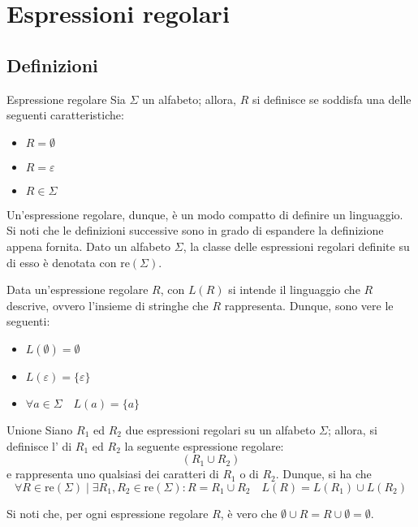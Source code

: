 \documentclass[a4paper, 12pt]{report}
\begin{document}
    \section{Espressioni regolari}

    \subsection{Definizioni}

    \begin{frameddefn}{Espressione regolare}
        Sia $\Sigma$ un alfabeto; allora, $R$ si definisce  se soddisfa una delle seguenti caratteristiche:

        \begin{itemize}
            \item $R = \emptyset$
            \item $R = \varepsilon$
            \item $R \in \Sigma$
        \end{itemize}

        Un'espressione regolare, dunque, è un modo compatto di definire un linguaggio. Si noti che le definizioni successive sono in grado di espandere la definizione appena fornita. Dato un alfabeto $\Sigma$, la classe delle espressioni regolari definite su di esso è denotata con $\mathrm{re}(\Sigma)$.

        Data un'espressione regolare $R$, con $L(R)$ si intende il linguaggio che $R$ descrive, ovvero l'insieme di stringhe che $R$ rappresenta. Dunque, sono vere le seguenti:

        \begin{itemize}
            \item $L(\emptyset) = \emptyset$
            \item $L(\varepsilon) = \{ \varepsilon \}$
            \item $\forall a \in \Sigma \quad L(a) = \{ a\}$
        \end{itemize}
    \end{frameddefn}

    \begin{frameddefn}{Unione}
        Siano $R_1$ ed $R_2$ due espressioni regolari su un alfabeto $\Sigma$; allora, si definisce l' di $R_1$ ed $R_2$ la seguente espressione regolare: $$(R_1 \cup R_2)$$ e rappresenta uno qualsiasi dei caratteri di $R_1$ o di $R_2$. Dunque, si ha che $$\forall R \in \mathrm{re}(\Sigma) \mid \exists R_1, R_2 \in \mathrm{re}(\Sigma) : R = R_1 \cup R_2 \quad L(R) = L(R_1) \cup L(R_2)$$

        Si noti che, per ogni espressione regolare $R$, è vero che $\emptyset \cup R = R \cup \emptyset = \emptyset$.
    \end{frameddefn}
\end{document}
